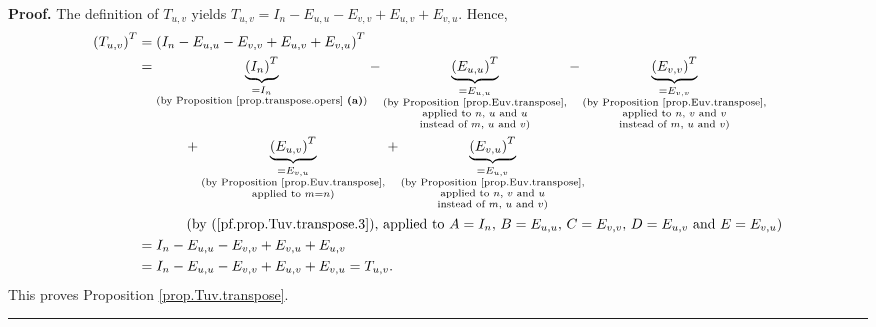 \documentclass[numbers=enddot,12pt,final,onecolumn,notitlepage]{scrartcl}%
\theoremstyle{definition}
\newenvironment{proof}[1][Proof]{\noindent\textbf{#1.} }{\ \rule{0.5em}{0.5em}}
\begin{document}
\begin{proof}
The definition of $T_{u,v}$ yields $T_{u,v}=I_{n}-E_{u,u}-E_{v,v}%
+E_{u,v}+E_{v,u}$. Hence,%
\begin{align*}
\left(  T_{u,v}\right)  ^{T}  &  =\left(  I_{n}-E_{u,u}-E_{v,v}+E_{u,v}%
+E_{v,u}\right)  ^{T}\\
&  =\underbrace{\left(  I_{n}\right)  ^{T}}_{\substack{=I_{n}\\\text{(by
Proposition \ref{prop.transpose.opers} \textbf{(a)})}}}-\underbrace{\left(
E_{u,u}\right)  ^{T}}_{\substack{=E_{u,u}\\\text{(by Proposition
\ref{prop.Euv.transpose},}\\\text{applied to }n\text{, }u\text{ and
}u\\\text{instead of }m\text{, }u\text{ and }v\text{)}}}-\underbrace{\left(
E_{v,v}\right)  ^{T}}_{\substack{=E_{v,v}\\\text{(by Proposition
\ref{prop.Euv.transpose},}\\\text{applied to }n\text{, }v\text{ and
}v\\\text{instead of }m\text{, }u\text{ and }v\text{)}}}\\
&  \ \ \ \ \ \ \ \ \ \ +\underbrace{\left(  E_{u,v}\right)  ^{T}%
}_{\substack{=E_{v,u}\\\text{(by Proposition \ref{prop.Euv.transpose}%
,}\\\text{applied to }m=n\text{)}}}+\underbrace{\left(  E_{v,u}\right)  ^{T}%
}_{\substack{=E_{u,v}\\\text{(by Proposition \ref{prop.Euv.transpose}%
,}\\\text{applied to }n\text{, }v\text{ and }u\\\text{instead of }m\text{,
}u\text{ and }v\text{)}}}\\
&  \ \ \ \ \ \ \ \ \ \ \left(  \text{by (\ref{pf.prop.Tuv.transpose.3}),
applied to }A=I_{n}\text{, }B=E_{u,u}\text{, }C=E_{v,v}\text{, }%
D=E_{u,v}\text{ and }E=E_{v,u}\right) \\
&  =I_{n}-E_{u,u}-E_{v,v}+E_{v,u}+E_{u,v}\\
&  =I_{n}-E_{u,u}-E_{v,v}+E_{u,v}+E_{v,u}=T_{u,v}.
\end{align*}
This proves Proposition \ref{prop.Tuv.transpose}.
\end{proof}
\end{document}
